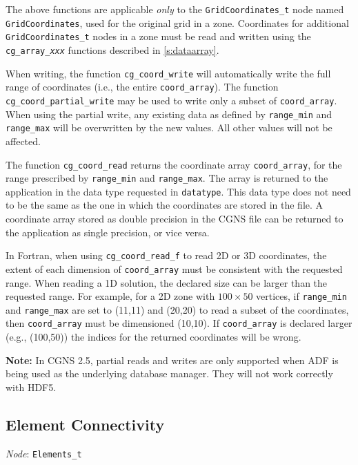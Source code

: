 The above functions are applicable \emph{only} to the 
\texttt{GridCoordinates\_t} node named \texttt{GridCoordinates}, used
for the original grid in a zone.
Coordinates for additional \texttt{GridCoordinates\_t} nodes in a zone
must be read and written using the \texttt{cg\_array\_\textit{xxx}} functions
described in \autoref{s:dataarray}.

When writing, the function \texttt{cg\_coord\_write} will
automatically write the full range of coordinates (i.e., the entire
\texttt{coord\_array}).
The function \texttt{cg\_coord\_partial\_write} may be used to write
only a subset of \texttt{coord\_array}.
When using the partial write, any existing data as defined by
\texttt{range\_min} and \texttt{range\_max} will be overwritten by the
new values.
All other values will not be affected.

The function \texttt{cg\_coord\_read} returns the coordinate array
\texttt{coord\_array}, for the range prescribed by \texttt{range\_min} and
\texttt{range\_max}.
The array is returned to the application in the data type requested in
\texttt{datatype}.
This data type does not need to be the same as the one in which the
coordinates are stored in the file.
A coordinate array stored as double precision in the CGNS file can be
returned to the application as single precision, or vice versa.

In Fortran, when using \texttt{cg\_coord\_read\_f} to read 2D or 3D
coordinates, the extent of each dimension of \texttt{coord\_array} must
be consistent with the requested range.
When reading a 1D solution, the declared size can be larger than the
requested range.
For example, for a 2D zone with $100 \times 50$ vertices, if
\texttt{range\_min} and \texttt{range\_max} are set to (11,11) and (20,20)
to read a subset of the coordinates, then \texttt{coord\_array} must be
dimensioned (10,10).
If \texttt{coord\_array} is declared larger (e.g., (100,50)) the
indices for the returned coordinates will be wrong.

\noindent
\textbf{Note:} In CGNS 2.5, partial reads and writes are only supported
when ADF is being used as the underlying database manager.
They will not work correctly with HDF5.

\newpage
\subsection{Element Connectivity}
\label{s:elements}

\noindent
\textit{Node}: \texttt{Elements\_t}

